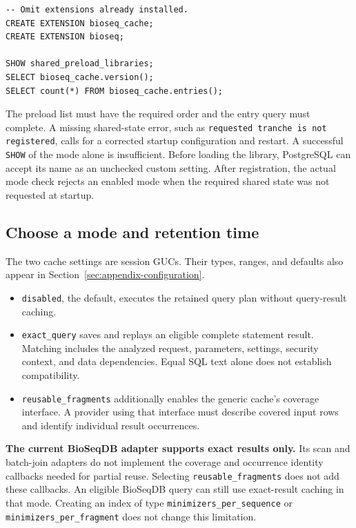 \par\noindent\begin{minipage}{\linewidth}
\begin{lstlisting}[style=bioseq-appendix-sql,
  caption={Install and check the extensions after restart.}]
-- Omit extensions already installed.
CREATE EXTENSION bioseq_cache;
CREATE EXTENSION bioseq;

SHOW shared_preload_libraries;
SELECT bioseq_cache.version();
SELECT count(*) FROM bioseq_cache.entries();
\end{lstlisting}
\end{minipage}

The preload list must have the required order and the entry query must
complete. A missing shared-state error, such as \texttt{requested tranche
is not registered}, calls for a corrected startup configuration and restart.
A successful \texttt{SHOW} of the mode alone is insufficient. Before loading
the library, PostgreSQL can accept its name as an unchecked custom setting.
After registration, the actual mode check rejects an enabled mode when the
required shared state was not requested at startup.

\subsection{Choose a mode and retention time}

The two cache settings are session GUCs. Their types, ranges, and defaults
also appear in Section~\ref{sec:appendix-configuration}.
\begin{itemize}
  \item \texttt{disabled}, the default, executes the retained query plan
    without query-result caching.
  \item \texttt{exact\_query} saves and replays an eligible complete
    statement result. Matching includes the analyzed request, parameters,
    settings, security context, and data dependencies. Equal SQL text alone
    does not establish compatibility.
  \item \texttt{reusable\_fragments} additionally enables the generic
    cache's coverage interface. A provider using that interface must describe
    covered input rows and identify individual result occurrences.
\end{itemize}

\textbf{The current BioSeqDB adapter supports exact results only.}
Its scan and batch-join adapters do not implement the coverage and occurrence
identity callbacks needed for partial reuse. Selecting
\texttt{reusable\_fragments} does not add these callbacks. An eligible
BioSeqDB query can still use exact-result caching in that mode. Creating an
index of type \texttt{minimizers\_per\_sequence} or
\texttt{minimizers\_per\_fragment} does not change this limitation.

